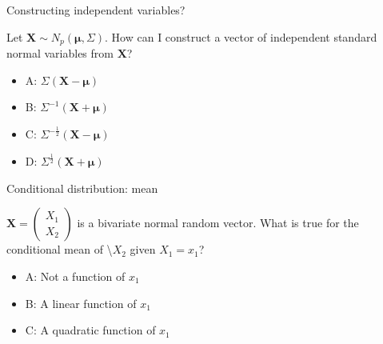 \documentclass[ignorenonframetext,]{beamer}
\providecommand{\tightlist}{%
  \setlength{\itemsep}{0pt}\setlength{\parskip}{0pt}}
\begin{document}
\begin{frame}

\begin{block}{Constructing independent variables?}

Let \(\mathbf{X}\sim N_p(\mathbf{\mu},\Sigma)\). How can I construct a
vector of independent standard normal variables from \(\mathbf{X}\)?

\begin{itemize}
\tightlist
\item
  A: \(\Sigma(\mathbf{X}-\mathbf{\mu})\)
\item
  B: \(\Sigma^{-1}(\mathbf{X}+\mathbf{\mu})\)
\item
  C: \(\Sigma^{-\frac{1}{2}}(\mathbf{X}-\mathbf{\mu})\)
\item
  D: \(\Sigma^{\frac{1}{2}}(\mathbf{X}+\mathbf{\mu})\)
\end{itemize}

\end{block}

\end{frame}

\begin{frame}

\begin{block}{Conditional distribution: mean}

\(\mathbf{X}=\left(\begin{array}{r}X_1 \\X_2 \end{array}\right)\) is a
bivariate normal random vector. What is true for the conditional mean of
\textbackslash{}\(X_2\) given \(X_1=x_1\)?

\begin{itemize}
\tightlist
\item
  A: Not a function of \(x_1\)
\item
  B: A linear function of \(x_1\)
\item
  C: A quadratic function of \(x_1\)
\end{itemize}

\end{block}

\end{frame}
\end{document}
